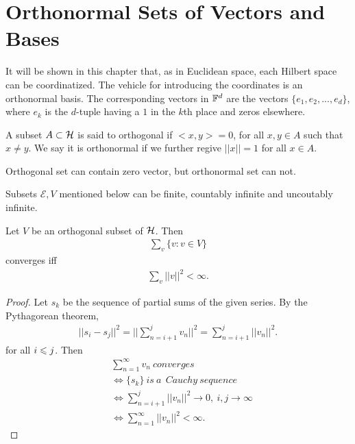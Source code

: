 \chapter{Orthonormal Sets of Vectors and Bases}\label{chp:1_4}



It will be shown in this chapter that, as in Euclidean space, each Hilbert 
space can be coordinatized. The vehicle for introducing the coordinates is 
an orthonormal basis. The corresponding vectors in $\mathbb{F}^d$ are the vectors 
$\{e_1, e_2, ... , e_d\}$, where $e_k$ is the $d$-tuple having a $1$ in the $k$th place and zeros elsewhere.

\begin{definition}{}{}
    A subset $A\subset \mathcal{H}$ is said to orthogonal if $<x,y>=0$, for all $x,y\in A$ such that $x\neq y$. 
    We say it is orthonormal if we further regive $||x||=1$ for all $x\in A$. 
\end{definition}

\begin{remark}
    Orthogonal set can contain zero vector, but orthonormal set can not. 
\end{remark}



Subsets $\mathscr{E}, V$ mentioned below can be finite, countably infinite and uncoutably infinite. 

\begin{proposition}{}{}
    Let $V$ be an orthogonal subset of $\mathcal{H}$. Then
    \begin{align*}
        \sum\limits_{v} \{v:v\in V\}
    \end{align*}
    converges iff 
    \begin{align*}
        \sum\limits_{v} ||v||^2<\infty.
    \end{align*}
\end{proposition}
\begin{proof}
    Let $s_k$ be the sequence of partial sums of the given series. By the Pythagorean theorem, 
    \begin{align*}
        ||s_i-s_j||^2 = ||\sum\limits_{n=i+1}^{j}v_n||^2 = \sum\limits_{n=i+1}^{j}||v_n||^2.
    \end{align*}
    for all $i\leqslant j$. Then
    \begin{align*}
        & \sum\limits_{n=1}^{\infty} v_n\ converges\\
        & \Leftrightarrow \{s_k\} \ is\  a\  \ Cauchy\  sequence\\
        & \Leftrightarrow \sum\limits_{n=i+1}^{j}||v_n||^2\rightarrow 0,\ i,j\rightarrow \infty\\
        & \Leftrightarrow \sum\limits_{n=1}^{\infty} ||v_n||^2<\infty.
    \end{align*}
\end{proof}

